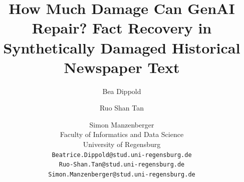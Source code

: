 \documentclass[11pt]{article}
\title{How Much Damage Can GenAI Repair? Fact Recovery in Synthetically Damaged Historical Newspaper Text}
\author{
  Bea Dippold \and Ruo Shan Tan \and Simon Manzenberger \\
  Faculty of Informatics and Data Science \\
  University of Regensburg \\
  \texttt{Beatrice.Dippold@stud.uni-regensburg.de} \\
  \texttt{Ruo-Shan.Tan@stud.uni-regensburg.de} \\
  \texttt{Simon.Manzenberger@stud.uni-regensburg.de}
}
\begin{document}
\maketitle

\begin{abstract}

\end{abstract}











% 
\end{document}
